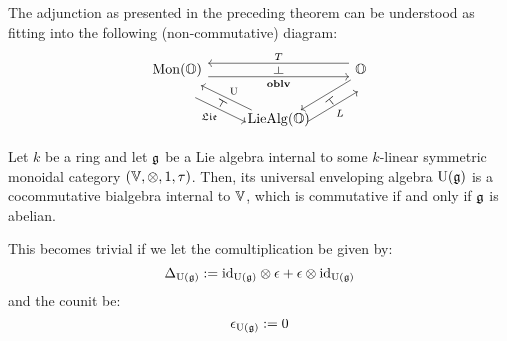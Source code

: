                     \begin{remark}
                        The adjunction as presented in the preceding theorem can be understood as fitting into the following (non-commutative) diagram:
                            $$
                                \begin{tikzcd}
                                	{\Mon(\O)} & {} & {\O} \\
                                	& {\Lie\Alg(\O)}
                                	\arrow["{\oblv}"{name=0, swap}, from=1-1, to=1-3, shift right=2]
                                	\arrow["{T}"{name=1, swap}, from=1-3, to=1-1, shift right=2]
                                	\arrow["{L}"{name=2, swap}, from=2-2, to=1-3, shift right=5]
                                	\arrow[""{name=3, inner sep=0}, from=1-3, to=2-2, shift left=1]
                                	\arrow["{\U}"{name=4, swap}, from=2-2, to=1-1, shift left=1]
                                	\arrow["{\frakLie}"{name=5, swap}, from=1-1, to=2-2, shift right=5]
                                	\arrow["\dashv"{rotate=-90}, from=1, to=0, phantom]
                                	\arrow["\dashv"{rotate=61}, from=5, to=4, phantom]
                                	\arrow["\dashv"{rotate=129}, from=2, to=3, phantom]
                                \end{tikzcd}
                            $$
                    \end{remark}
                    \begin{remark} \label{remark: universal_enveloping_algebras_are_bialgebras}
                        Let $k$ be a ring and let $\mathfrak{g}$ be a Lie algebra internal to some $k$-linear symmetric monoidal category $(\V, \tensor, 1, \tau)$. Then, its universal enveloping algebra $\mathrm{U}(\mathfrak{g})$ is a cocommutative bialgebra internal to $\mathbb{V}$, which is commutative if and only if $\mathfrak{g}$ is abelian. 
                        
                        This becomes trivial if we let the comultiplication be given by:
                            $$\Delta_{\U(\g)} := \id_{\U(\g)} \tensor \e + \e \tensor \id_{\U(\g)}$$
                        and the counit be:
                            $$\epsilon_{\mathrm{U}(\mathfrak{g})} := 0$$
                    \end{remark}
                        
